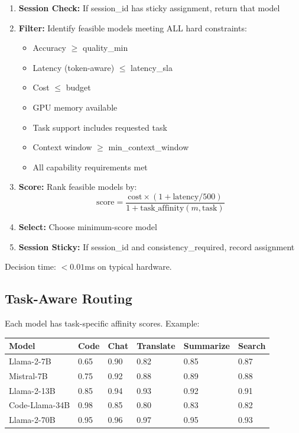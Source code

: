 \documentclass[11pt]{article}
\begin{document}
\begin{enumerate}
    \item \textbf{Session Check:} If session\_id has sticky assignment, return that model
    \item \textbf{Filter:} Identify feasible models meeting ALL hard constraints:
    \begin{itemize}
        \item Accuracy $\geq$ quality\_min
        \item Latency (token-aware) $\leq$ latency\_sla
        \item Cost $\leq$ budget
        \item GPU memory available
        \item Task support includes requested task
        \item Context window $\geq$ min\_context\_window
        \item All capability requirements met
    \end{itemize}
    \item \textbf{Score:} Rank feasible models by:
    $$\text{score} = \frac{\text{cost} \times (1 + \text{latency}/500)}{1 + \text{task\_affinity}(m, \text{task})}$$
    \item \textbf{Select:} Choose minimum-score model
    \item \textbf{Session Sticky:} If session\_id and consistency\_required, record assignment
\end{enumerate}

Decision time: $<0.01$ms on typical hardware.

\subsection{Task-Aware Routing}

Each model has task-specific affinity scores. Example:
\begin{table}[h]
\centering
\begin{tabular}{llllll}
\toprule
\textbf{Model} & \textbf{Code} & \textbf{Chat} & \textbf{Translate} & \textbf{Summarize} & \textbf{Search} \\
\midrule
Llama-2-7B & 0.65 & 0.90 & 0.82 & 0.85 & 0.87 \\
Mistral-7B & 0.75 & 0.92 & 0.88 & 0.89 & 0.88 \\
Llama-2-13B & 0.85 & 0.94 & 0.93 & 0.92 & 0.91 \\
Code-Llama-34B & 0.98 & 0.85 & 0.80 & 0.83 & 0.82 \\
Llama-2-70B & 0.95 & 0.96 & 0.97 & 0.95 & 0.93 \\
\bottomrule
\end{tabular}
\end{table}
\end{document}
